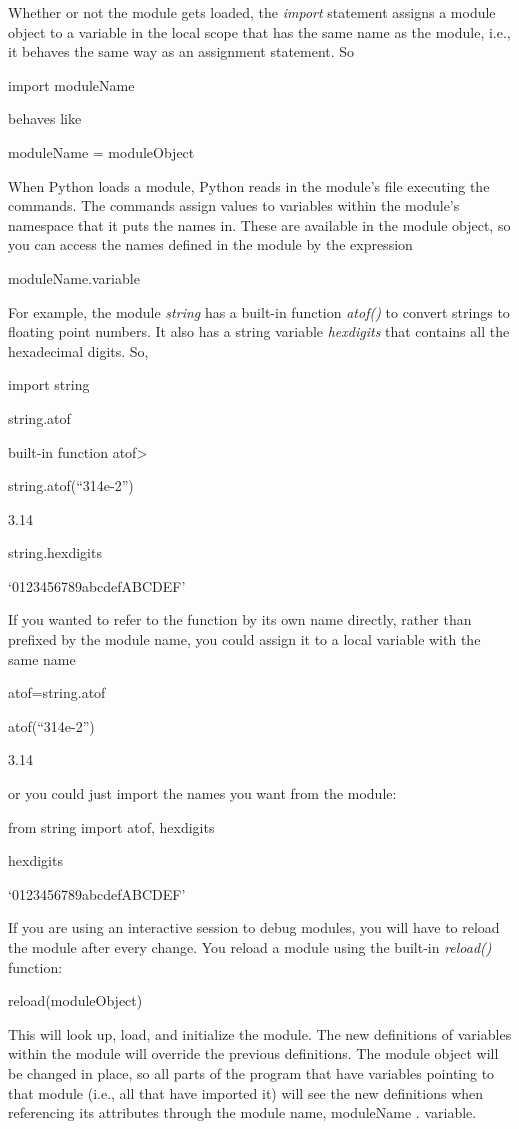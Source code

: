 Whether or not the module gets
loaded, the \emph{import} statement assigns a module object to a
variable in the local scope that has the same name as the module, i.e.,
it behaves the same way as an assignment statement. So

import moduleName

behaves like

moduleName = moduleObject

When Python loads a module, Python
reads in the module's file executing the commands. The commands assign
values to variables within the module's namespace that it puts the names
in. These are available in the module object, so you can access the
names defined in the module by the expression

moduleName.variable

For example, the module
\emph{string} has a built-in function \emph{atof()} to convert strings
to floating point numbers. It also has a string variable
\emph{hexdigits} that contains all the hexadecimal digits. So,


import string


string.atof

built-in function
atof\textgreater{}


string.atof(``314e-2'')

3.14


string.hexdigits

`0123456789abcdefABCDEF'

If you wanted to refer to the
function by its own name directly, rather than prefixed by the module
name, you could assign it to a local variable with the same name


atof=string.atof


atof(``314e-2'')

3.14

or you could just import the names
you want from the module:


from string import atof, hexdigits


hexdigits

`0123456789abcdefABCDEF'

If you are using an interactive
session to debug modules, you will have to reload the module after every
change. You reload a module using the built-in \emph{reload()} function:

reload(moduleObject)

This will look up, load, and
initialize the module. The new definitions of variables within the
module will override the previous definitions. The module object will be
changed in place, so all parts of the program that have variables
pointing to that module (i.e., all that have imported it) will see the
new definitions when referencing its attributes through the module name,
moduleName . variable.

